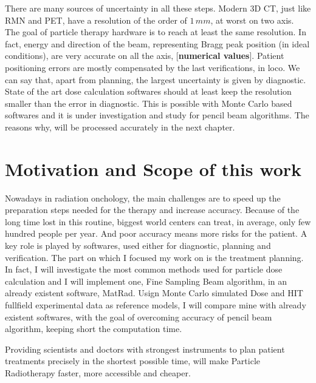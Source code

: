 \documentclass[12pt, a4paper, twoside]{book}
\begin{document}
There are many sources of uncertainty in all these steps.
Modern 3D CT, just like RMN and PET, have a resolution of the order of $1\,mm$, at worst on two axis. The goal of particle therapy hardware is to reach at least the same resolution. In fact, energy and direction of the beam, representing Bragg peak position (in ideal conditions), are very accurate on all the axis, [\textbf{numerical values}].
Patient positioning errors are mostly compensated by the last verifications, in loco.
We can say that, apart from planning, the largest uncertainty is given by diagnostic.
State of the art dose calculation softwares should at least keep the resolution smaller than the error in diagnostic. This is possible with Monte Carlo based softwares and it is under investigation and study for pencil beam algorithms. The reasons why, will be processed accurately in the next chapter.



\section{Motivation and Scope of this work} 
Nowadays in radiation onchology, the main challenges are to speed up the preparation steps needed for the therapy and increase accuracy. Because of the long time lost in this routine, biggest world centers can treat, in average, only few hundred people per year. And poor accuracy means more risks for the patient.
A key role is played by softwares, used either for diagnostic, planning and verification.
The part on which I focused my work on is the treatment planning. In fact, I will investigate the most common methods used for particle dose calculation and I will implement one, Fine Sampling Beam algorithm, in an already existent software, MatRad. 
Usign Monte Carlo simulated Dose and HIT fullfield experimental data as reference models, I will compare mine with already existent softwares, with the goal of overcoming accuracy of pencil beam algorithm, keeping short the computation time.  

Providing scientists and doctors with strongest instruments to plan patient treatments precisely in the shortest possible time, will make Particle Radiotherapy faster, more accessible and cheaper.
\end{document}
